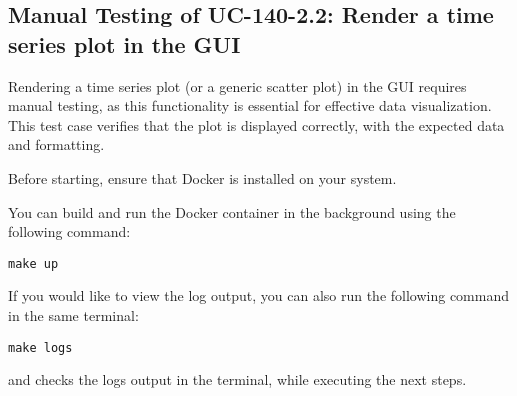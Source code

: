 \subsection{Manual Testing of UC-140-2.2: Render a time series plot in the GUI}

Rendering a time series plot (or a generic scatter plot) in the GUI requires manual testing, as this functionality is essential for effective data visualization.
This test case verifies that the plot is displayed correctly, with the expected data and formatting.

Before starting, ensure that Docker is installed on your system.

You can build and run the Docker container in the background using the following command:
\begin{verbatim}
make up
\end{verbatim}

If you would like to view the log output, you can also run the following command in the same terminal:
\begin{verbatim}
make logs
\end{verbatim}
and checks the logs output in the terminal, while executing the next steps.


